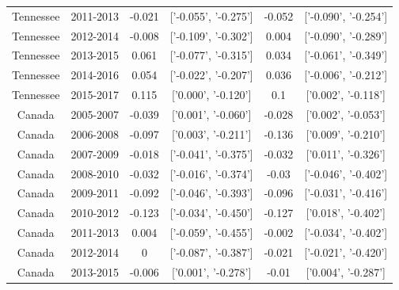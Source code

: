 \documentclass[utf8]{FrontiersinHarvard} %
\begin{document}
\begin{table}[h]
\begin{tabular}{|c|c|c|c|c|c|}
		Tennessee & 2011-2013        & -0.021                         & ['-0.055', '-0.275']           & -0.052 & ['-0.090', '-0.254'] \\
		Tennessee & 2012-2014        & -0.008                         & ['-0.109', '-0.302']           & 0.004  & ['-0.090', '-0.289'] \\
		Tennessee & 2013-2015        & 0.061                          & ['-0.077', '-0.315']           & 0.034  & ['-0.061', '-0.349'] \\
		Tennessee & 2014-2016        & 0.054                          & ['-0.022', '-0.207']           & 0.036  & ['-0.006', '-0.212'] \\
		Tennessee & 2015-2017        & 0.115                          & ['0.000', '-0.120']            & 0.1    & ['0.002', '-0.118']  \\
		\midrule
		Canada    & 2005-2007        & -0.039                         & ['0.001', '-0.060']            & -0.028 & ['0.002', '-0.053']  \\
		Canada    & 2006-2008        & -0.097                         & ['0.003', '-0.211']            & -0.136 & ['0.009', '-0.210']  \\
		Canada    & 2007-2009        & -0.018                         & ['-0.041', '-0.375']           & -0.032 & ['0.011', '-0.326']  \\
		Canada    & 2008-2010        & -0.032                         & ['-0.016', '-0.374']           & -0.03  & ['-0.046', '-0.402'] \\
		Canada    & 2009-2011        & -0.092                         & ['-0.046', '-0.393']           & -0.096 & ['-0.031', '-0.416'] \\
		Canada    & 2010-2012        & -0.123                         & ['-0.034', '-0.450']           & -0.127 & ['0.018', '-0.402']  \\
		Canada    & 2011-2013        & 0.004                          & ['-0.059', '-0.455']           & -0.002 & ['-0.034', '-0.402'] \\
		Canada    & 2012-2014        & 0                              & ['-0.087', '-0.387']           & -0.021 & ['-0.021', '-0.420'] \\
		Canada    & 2013-2015        & -0.006                         & ['0.001', '-0.278']            & -0.01  & ['0.004', '-0.287']  \\
		\bottomrule
	\end{tabular}
\end{table}
\end{document}
